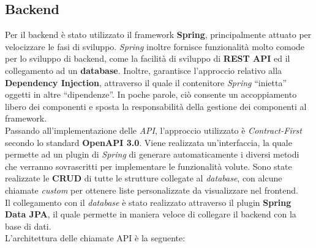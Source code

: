 \documentclass{article}
\begin{document}
\subsection*{Backend}
Per il backend è stato utilizzato il framework \textbf{Spring}, principalmente attuato per velocizzare le fasi di sviluppo. \textit{Spring} inoltre fornisce funzionalità molto comode per lo sviluppo di backend, come la facilità di sviluppo di \textbf{REST API} ed il collegamento ad un \textbf{database}. Inoltre, garantisce l'approccio relativo alla \textbf{Dependency Injection}, attraverso il quale il contenitore \textit{Spring} “inietta” oggetti in altre “dipendenze”. In poche parole, ciò consente un accoppiamento libero dei componenti e sposta la responsabilità della gestione dei componenti al framework.\vspace*{7pt}\\
Passando all'implementazione delle \textit{API}, l'approccio utilizzato è \textit{Contract-First} secondo lo standard \textbf{OpenAPI 3.0}. Viene realizzata un'interfaccia, la quale permette ad un plugin di \textit{Spring} di generare automaticamente i diversi metodi che verranno sovrascritti per implementare le funzionalità volute. Sono state realizzate le \textbf{CRUD} di tutte le strutture collegate al \textit{database}, con alcune chiamate \textit{custom} per ottenere liste personalizzate da visualizzare nel frontend.\vspace*{7pt}\\
Il collegamento con il \textit{database} è stato realizzato attraverso il plugin \textbf{Spring Data JPA}, il quale permette in maniera veloce di collegare il backend con la base di dati.\vspace*{7pt}\\
L'architettura delle chiamate API è la seguente:
\end{document}
